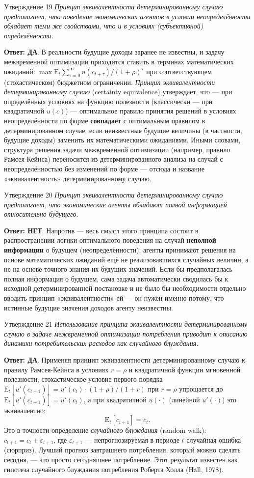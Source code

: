 \documentclass[10pt,a4paper]{article}
\newcommand{\qda}{\textbf{\color{yesgreen}Ответ: ДА}}
\newcommand{\qnet}{\textbf{\color{nored}Ответ: НЕТ}}
\newenvironment{answer}[2]{%
  \begin{qbox}{Утверждение #1}
  \textit{#2}\par\smallskip
}{%
  \end{qbox}\vspace{2pt}
}
\begin{document}
\begin{answer}{19}{Принцип эквивалентности детерминированному случаю предполагает, что поведение экономических агентов в условии неопределённости обладает теми же свойствами, что и в условиях (субъективной) определённости.}
\qda. В реальности будущие доходы заранее не известны, и задачу межвременной оптимизации приходится ставить в терминах математических ожиданий: $\max \mathrm{E}_t\sum_{\tau=0}^{\infty}u(c_{t+\tau})/(1+\rho)^\tau$ при соответствующем (стохастическом) бюджетном ограничении. \emph{Принцип эквивалентности детерминированному случаю} (certainty equivalence) утверждает, что — при определённых условиях на функцию полезности (классически — при квадратичной $u(c)$) — оптимальное правило принятия решений в условиях неопределённости по форме \textbf{совпадает} с оптимальным правилом в детерминированном случае, если неизвестные будущие величины (в частности, будущие доходы) заменить их математическими ожиданиями. Иными словами, структура решения задачи межвременной оптимизации (например, правило Рамсея-Кейнса) переносится из детерминированного анализа на случай с неопределённостью без изменений по форме — отсюда и название «эквивалентность» детерминированному случаю.
\end{answer}
 
\begin{answer}{20}{Принцип эквивалентности детерминированному случаю предполагает, что экономические агенты обладают полной информацией относительно будущего.}
\qnet. Напротив — весь смысл этого принципа состоит в распространении логики оптимального поведения на случай \textbf{неполной информации} о будущем (неопределённости): агенты принимают решения на основе математических ожиданий ещё не реализовавшихся случайных величин, а не на основе точного знания их будущих значений. Если бы предполагалась полная информация о будущем, сама задача автоматически сводилась бы к исходной детерминированной постановке и не было бы необходимости отдельно вводить принцип «эквивалентности» ей — он нужен именно потому, что истинные будущие значения доходов агенту неизвестны.
\end{answer}
 
\begin{answer}{21}{Использование принципа эквивалентности детерминированному случаю в задаче межвременной оптимизации потребления приводит к описанию динамики потребительских расходов как случайного блуждания.}
\qda. Применяя принцип эквивалентности детерминированному случаю к правилу Рамсея-Кейнса в условиях $r=\rho$ и квадратичной функции мгновенной полезности, стохастическое условие первого порядка $\mathrm{E}_t[u'(c_{t+1})]=u'(c_t)\cdot(1+\rho)/(1+r)$ при $r=\rho$ упрощается до $\mathrm{E}_t[u'(c_{t+1})]=u'(c_t)$, а при квадратичной $u(\cdot)$ (линейной $u'(\cdot)$) это эквивалентно:
\[
\mathrm{E}_t[c_{t+1}] = c_t.
\]
Это в точности определение \emph{случайного блуждания} (random walk): $c_{t+1}=c_t+\varepsilon_{t+1}$, где $\varepsilon_{t+1}$ — непрогнозируемая в периоде $t$ случайная ошибка (сюрприз). Лучший прогноз завтрашнего потребления, который можно сделать сегодня, — это просто сегодняшнее потребление. Этот результат известен как гипотеза случайного блуждания потребления Роберта Холла (Hall, 1978).
\end{answer}
 
\end{document}
